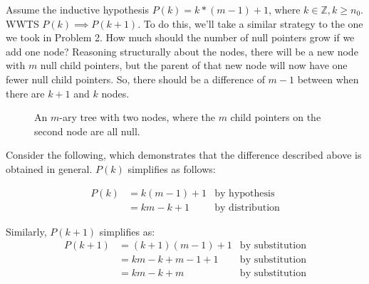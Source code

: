 \documentclass[10pt,letterpaper,final]{report}
\begin{document}
Assume the inductive hypothesis $P(k) = k*(m-1)+1$, where $k \in \mathbb{Z}, k \ge n_0$. WWTS $P(k) \implies P(k+1)$. To do this, we'll take a similar strategy to the one we took in Problem 2. How much should the number of null pointers grow if we add one node? Reasoning structurally about the nodes, there will be a new node with $m$ null child pointers, but the parent of that new node will now have one fewer null child pointers. So, there should be a difference of $m-1$ between when there are $k+1$ and $k$ nodes.

\begin{figure}[H]
  \centering

  \caption{An $m$-ary tree with two nodes, where the $m$ child pointers on the second node are all null.}\label{fig:m-ary-tree-with-two-nodes}
\end{figure}

Consider the following, which demonstrates that the difference described above is obtained in general. $P(k)$ simplifies as follows:

\begin{align*}
  P(k) & = k(m-1)+1 & \text{by hypothesis}   \\
       & = km-k+1   & \text{by distribution}
\end{align*}

Similarly, $P(k+1)$ simplifies as:
\begin{align*}
  P(k+1) & = (k+1)(m-1)+1       & \text{by substitution} \\
         & = km - k + m - 1 + 1 & \text{by substitution} \\
         & = km - k + m         & \text{by substitution}
\end{align*}
\end{document}
